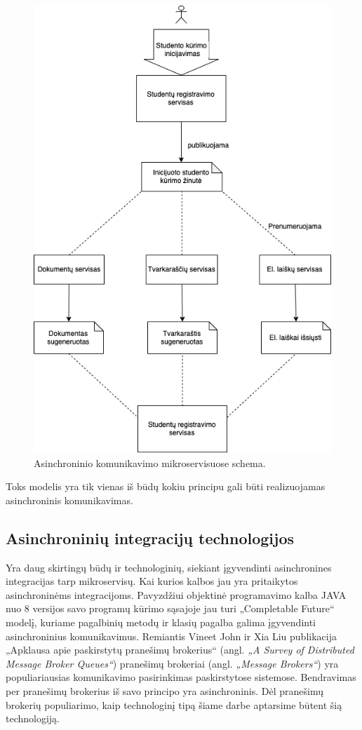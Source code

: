 \begin{figure}[H]
  \centering
  \includegraphics[scale=0.6]{img/asynchronous-microservice-model}
  \caption{Asinchroninio komunikavimo mikroservisuose schema.}
  \label{img:asynchronous-microservice-model}
\end{figure}

Toks modelis yra tik vienas iš būdų kokiu principu gali būti realizuojamas asinchroninis komunikavimas.

\subsection{Asinchroninių integracijų technologijos}
Yra daug skirtingų būdų ir technologinių, siekiant įgyvendinti asinchronines integracijas tarp mikroservisų.
Kai kurios kalbos jau yra pritaikytos asinchroninėms integracijoms. Pavyzdžiui objektinė programavimo kalba JAVA nuo 8 versijos savo programų kūrimo sąsajoje
jau turi „Completable Future“ modelį, kuriame pagalbinių metodų ir klasių  pagalba galima įgyvendinti asinchroninius komunikavimus.
Remiantis Vineet John ir Xia Liu publikacija „Apklausa apie paskirstytų pranešimų brokerius“ (angl. \textit{„A Survey of Distributed Message Broker Queues“}) \cite{Sur1}
pranešimų brokeriai (angl. \textit{„Message Brokers“}) yra populiariausias komunikavimo pasirinkimas paskirstytose sistemose. Bendravimas per pranešimų brokerius
iš savo principo yra asinchroninis. Dėl pranešimų brokerių populiarimo, kaip technologinį tipą šiame darbe aptarsime būtent šią technologiją.

